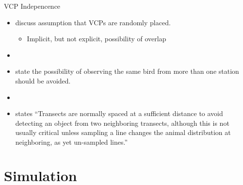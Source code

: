 \documentclass{beamer}
\begin{document}
\begin{frame}{VCP Indepencence}
	\begin{itemize}
	\item \textcite{ramsey1979,buckland1987,thompson2012} discuss assumption that VCPs are randomly placed.
	\begin{itemize}
	\item Implicit, but not explicit, possibility of overlap
	\end{itemize}
	\item[]
	\item \textcite{reynolds1980} state the possibility of observing the same bird from more than one station should be avoided.
	\item[]
	\item \textcite{buckland2001} states ``Transects are normally spaced at a sufficient distance to avoid detecting an object from two neighboring transects, although this is not usually critical unless sampling a line changes the animal distribution at neighboring, as yet un-sampled lines.''
	\end{itemize}
	
\end{frame}

\section{Simulation}
\end{document}

